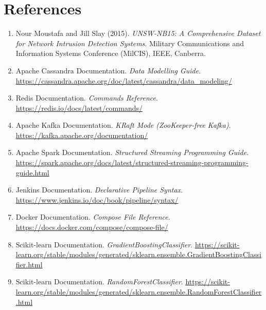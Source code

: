 \documentclass[12pt,a4paper]{report}
\begin{document}
\chapter{References}

\begin{enumerate}
  \item Nour Moustafa and Jill Slay (2015).
        \textit{UNSW-NB15: A Comprehensive Dataset for Network Intrusion
        Detection Systems}.  Military Communications and Information Systems
        Conference (MilCIS), IEEE, Canberra.

  \item Apache Cassandra Documentation.
        \textit{Data Modelling Guide}.
        \url{https://cassandra.apache.org/doc/latest/cassandra/data_modeling/}

  \item Redis Documentation.
        \textit{Commands Reference}.
        \url{https://redis.io/docs/latest/commands/}

  \item Apache Kafka Documentation.
        \textit{KRaft Mode (ZooKeeper-free Kafka)}.
        \url{https://kafka.apache.org/documentation/}

  \item Apache Spark Documentation.
        \textit{Structured Streaming Programming Guide}.
        \url{https://spark.apache.org/docs/latest/structured-streaming-programming-guide.html}

  \item Jenkins Documentation.
        \textit{Declarative Pipeline Syntax}.
        \url{https://www.jenkins.io/doc/book/pipeline/syntax/}

  \item Docker Documentation.
        \textit{Compose File Reference}.
        \url{https://docs.docker.com/compose/compose-file/}

  \item Scikit-learn Documentation.
        \textit{GradientBoostingClassifier}.
        \url{https://scikit-learn.org/stable/modules/generated/sklearn.ensemble.GradientBoostingClassifier.html}

  \item Scikit-learn Documentation.
        \textit{RandomForestClassifier}.
        \url{https://scikit-learn.org/stable/modules/generated/sklearn.ensemble.RandomForestClassifier.html}
\end{enumerate}
\end{document}
